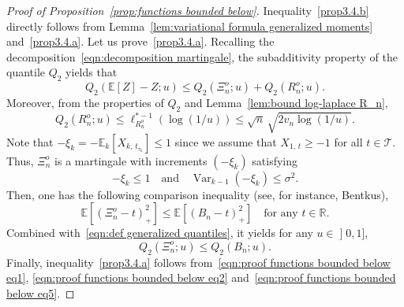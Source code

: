 \documentclass[AHL,Unicode,longabstracts,published]{cedram}
\DeclareMathOperator{\Var}{Var}
\newcommand{\bE}{\mathbb{E}}
\newcommand{\bR}{\mathbb{R}}
\newcommand{\cT}{\mathcal{T}}
\newcommand{\intervalleof}[2]{\mathopen{]} #1\mathclose{}\mathpunct{},#2\mathclose{]}}
\begin{document}
\begin{proof}[Proof of Proposition~\ref{prop:functions bounded below}]
Inequality~\eqref{prop3.4.b} directly follows from Lemma~\ref{lem:variational formula generalized moments} and~\eqref{prop3.4.a}. Let us prove~\eqref{prop3.4.a}. Recalling the decomposition~\eqref{eqn:decomposition martingale}, the subadditivity property of the quantile $Q_2$ yields that
\begin{equation}\label{eqn:proof functions bounded below eq1}
Q_2\left(\bE[Z]-Z;u\right)\leq Q_2\left(\Xi_n^o;u\right)+Q_2\left(R_n^o;u\right).
\end{equation}
Moreover, from the properties of $Q_2$ and Lemma~\ref{lem:bound log-laplace R_n},
\begin{equation}\label{eqn:proof functions bounded below eq2}
Q_2\left(R_n^o;u\right)\leq \ell_{R_n^o}^{*-1}(\log(1/u))\leq \sqrt{n}\,\sqrt{2v_n\log(1/u)}.
\end{equation}
Note that $-\xi_k=-\bE_k[X_{k,\,t_{\tau_k}}]\leq 1$ since we assume that $X_{1,\,t}\geq -1$ for all $t\in\cT$. Thus, $\Xi_n^o$ is a martingale with increments $(-\xi_k)$ satisfying
\begin{equation}\label{eqn:proof functions bounded below eq3}
-\xi_k\leq 1\quad\text{and}\quad \Var_{k-1}(-\xi_k)\leq\sigma^2.
\end{equation}
Then, one has the following comparison inequality (see, for instance, Bentkus\cite[Lemma~4.4]{Bentkus04}),
\begin{equation}\label{eqn:proof functions bounded below eq4}
\bE\left[(\Xi_n^o-t)_+^2\right]\leq\bE\left[(B_n-t)_+^2\right]\quad\text{for any }t\in\bR.
\end{equation}
Combined with~\eqref{eqn:def generalized quantiles}, it yields for any $u\in\intervalleof 01$,
\begin{equation}\label{eqn:proof functions bounded below eq5}
Q_2(\Xi_n^o;u)\leq Q_2(B_n;u).
\end{equation}
Finally, inequality~\eqref{prop3.4.a} follows from~\eqref{eqn:proof functions bounded below eq1}, \eqref{eqn:proof functions bounded below eq2} and~\eqref{eqn:proof functions bounded below eq5}.
\end{proof}
\end{document}
